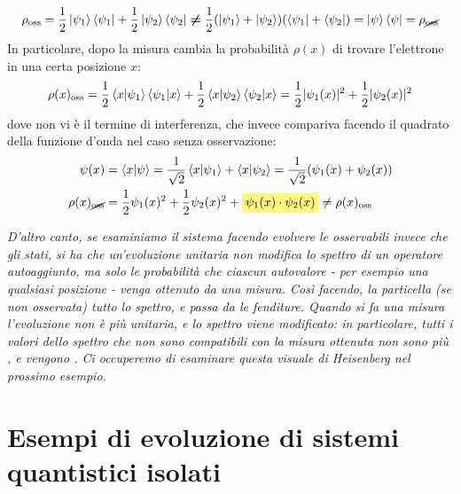 \documentclass[../../FisicaTeorica.tex]{subfiles}
\begin{document}
\[
\rho_{\text{oss}}=
\frac{1}{2}\ket{\psi_1}\bra{\psi_1}+\frac{1}{2}\ket{\psi_2}\bra{\psi_2} \bm{\neq} \frac{1}{2}(\ket{\psi_1}+\ket{\psi_2})(\bra{\psi_1}+\bra{\psi_2})=\ket{\psi}\bra{\psi} = \rho_{\cancel{\text{oss}}}
\]
In particolare, dopo la misura cambia la probabilità $\rho(x)$ di trovare l'elettrone in una certa posizione $x$:
\[
\rho(x)_{\text{oss}}=\frac{1}{2}\braket{x|\psi_1}\braket{\psi_1|x}+\frac{1}{2}\braket{x|\psi_2}\braket{\psi_2|x}=\frac{1}{2}|\psi_1(x)|^2+\frac{1}{2}|\psi_2(x)|^2
\]
dove non vi è il termine di interferenza, che invece compariva facendo il quadrato della funzione d'onda nel caso senza osservazione:
\begin{align*}
\psi(x)&=\braket{x|\psi}=\frac{1}{\sqrt{2}}\braket{x|\psi_1}+\braket{x|\psi_2}=\frac{1}{\sqrt{2}}(\psi_1(x)+\psi_2(x))\\
\rho(x)_{\cancel{\text{oss}}} &= \frac{1}{2}\psi_1(x)^2 + \frac{1}{2}\psi_2(x)^2 + \hlc{Yellow}{\psi_1(x)\cdot \psi_2(x)} \neq \rho(x)_{\text{oss}}
\end{align*}

\textit{D'altro canto, se esaminiamo il sistema facendo evolvere le osservabili invece che gli stati, si ha che un'evoluzione unitaria non modifica lo spettro di un operatore autoaggiunto, ma solo le probabilità che ciascun autovalore - per esempio una qualsiasi posizione - venga ottenuto da una misura. Così facendo, la particella (se non osservata)  tutto lo spettro, e passa da  le fenditure. Quando si fa una misura l'evoluzione non è più unitaria, e lo spettro viene modificato: in particolare, tutti i valori dello spettro che non sono compatibili con la misura ottenuta non sono più , e vengono . Ci occuperemo di esaminare questa visuale di Heisenberg nel prossimo esempio.}

\section{Esempi di evoluzione di sistemi quantistici isolati}
\end{document}
